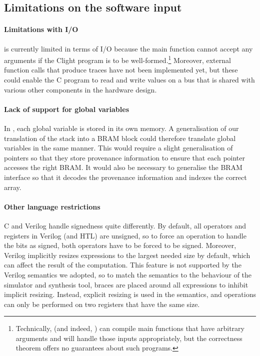 \subsection{Limitations on the software input}


\paragraph{Limitations with I/O}

\vericert{} is currently limited in terms of I/O because the main function cannot accept any arguments if the Clight program is to be well-formed.\footnote{Technically, \vericert{} (and indeed, \compcert{}) can compile main functions that have arbitrary arguments and will handle those inputs appropriately, but the correctness theorem offers no guarantees about such programs.} Moreover, external function calls that produce traces have not been implemented yet, but these could enable the C program to read and write values on a bus that is shared with various other components in the hardware design.

\paragraph{Lack of support for global variables}
In \compcert{}, each global variable is stored in its own memory.  A generalisation of our translation of the stack into a \gls{BRAM} block could therefore translate global variables in the same manner.  This would require a slight generalisation of pointers so that they store provenance information to ensure that each pointer accesses the right \gls{BRAM}. It would also be necessary to generalise the \gls{BRAM} interface so that it decodes the provenance information and indexes the correct array.

\paragraph{Other language restrictions}
C and Verilog handle signedness quite differently. By default, all operators and registers in Verilog (and HTL) are unsigned, so to force an operation to handle the bits as signed, both operators have to be forced to be signed. Moreover, Verilog implicitly resizes expressions to the largest needed size by default, which can affect the result of the computation.  This feature is not supported by the Verilog semantics we adopted, so to match the semantics to the behaviour of the simulator and synthesis tool, braces are placed around all expressions to inhibit implicit resizing.  Instead, explicit resizing is used in the semantics, and operations can only be performed on two registers that have the same size.

